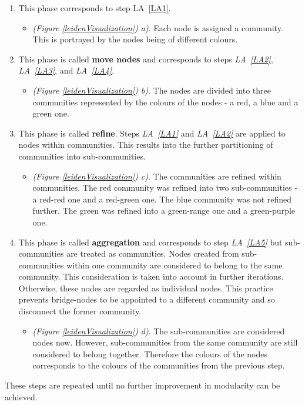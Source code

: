 \begin{enumerate}[label=\alph*)]
  \item This phase corresponds to step LA~\ref{LA1}. 
  \begin{itemize}
    \item \textit{(Figure \ref{leidenVisualization}) a)}. Each node is assigned a community. This is portrayed by the nodes being of different colours. \label{leidenAlgorithmPrincipleA}
  \end{itemize} 
    \label{LeAa}
  \item This phase is called \textbf{move nodes} and corresponds to steps \textit{LA~\ref{LA2}}, \textit{LA~\ref{LA3}}, and \textit{LA~\ref{LA4}}. 
  \begin{itemize}
    \item \textit{(Figure \ref{leidenVisualization}) b)}. The nodes are divided into three communities represented by the colours of the nodes - a red, a blue and a green one. \label{leidenAlgorithmPrincipleB}
  \end{itemize} 
    \label{LeAb}
  \item This phase is called \textbf{refine}. Steps \textit{LA~\ref{LA1}} and \textit{LA~\ref{LA2}} are applied to nodes within communities. This results into the further partitioning of communities into sub-communities.
  \begin{itemize}
    \item \textit{(Figure \ref{leidenVisualization}) c)}. The communities are refined within communities. The red community was refined into two sub-communities - a red-red one and a red-green one. The blue community was not refined further. The green was refined into a green-range one and a green-purple one. 
  \end{itemize} 
    \label{LeAc}
  \item This phase is called \textbf{aggregation} and corresponds to step \textit{LA~\ref{LA5}}  but sub-communities are treated as communities. Nodes created from sub-communities within one community are considered to belong to the same community. This consideration is taken into account in further iterations. Otherwise, these nodes are regarded as individual nodes. This practice prevents bridge-nodes to be appointed to a different community and so disconnect the former community.
  \begin{itemize}
    \item \textit{(Figure \ref{leidenVisualization}) d)}. The sub-communities are considered nodes now. However, sub-communities from the same community are still considered to belong together. Therefore the colours of the nodes corresponds to the colours of the communities from the previous step. 
  \end{itemize} 
    \label{LeAd}
\end{enumerate}
These steps are repeated until no further improvement in modularity can be achieved. 

